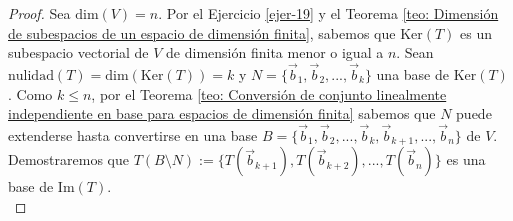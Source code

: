 \documentclass[notasLineal]{subfiles}
\begin{document}
\begin{proof}

    Sea $\text{dim}(V)=n$. Por el Ejercicio \ref{ejer-19} y el Teorema \ref{teo: Dimensión de subespacios de un espacio de dimensión finita}, sabemos que $\text{Ker}(T)$ es un subespacio vectorial de $V$ de dimensión finita menor o igual a $n$. Sean $\text{nulidad}(T)=\text{dim}(\text{Ker}(T))=k$ y $N=\{\vec{b}_1,\vec{b}_2,...,\vec{b}_k\}$ una base de $\text{Ker}(T)$. Como $k\le n$, por el Teorema \ref{teo: Conversión de conjunto linealmente independiente en base para espacios de dimensión finita} sabemos que $N$ puede extenderse hasta convertirse en una base $B=\{\vec{b}_1,\vec{b}_2,...,\vec{b}_k, \vec{b}_{k+1}, ..., \vec{b}_n\}$ de $V$. Demostraremos que $T(B\setminus N):=\{T(\vec{b}_{k+1}),T(\vec{b}_{k+2}),...,T(\vec{b}_n)\}$ es una base de $\text{Im}(T)$. \\


\end{proof}
\end{document}

